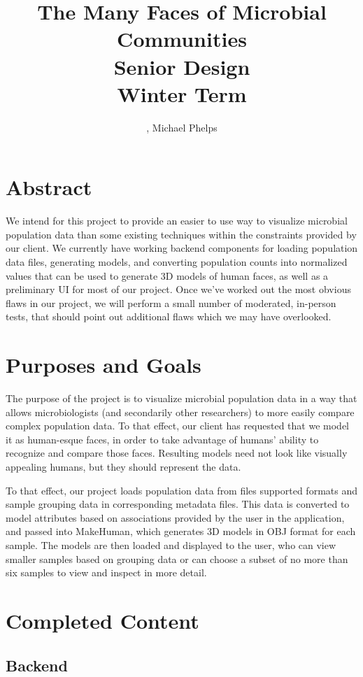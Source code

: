 \documentclass[letterpaper,10pt, onecolumn]{IEEEtran}
\title{The Many Faces of Microbial Communities \\\large Senior Design\\Winter Term\\}
\author{\name, Michael Phelps}
\begin{document}
\maketitle
\section*{Abstract}
We intend for this project to provide an easier to use way to visualize microbial population data than some existing techniques within the constraints provided by our client. We currently have working backend components for loading population data files, generating models, and converting population counts into normalized values that can be used to generate 3D models of human faces, as well as a preliminary UI for most of our project. Once we've worked out the most obvious flaws in our project, we will perform a small number of moderated, in-person tests, that should point out additional flaws which we may have overlooked. 

\clearpage
\section*{Purposes and Goals}

The purpose of the project is to visualize microbial population data in a way that allows microbiologists (and secondarily other researchers) to more easily compare complex population data. To that effect, our client has requested that we model it as human-esque faces, in order to take advantage of humans' ability to recognize and compare those faces. Resulting models need not look like visually appealing humans, but they should represent the data.

To that effect, our project loads population data from files supported formats and sample grouping data in corresponding metadata files. This data is converted to model attributes based on associations provided by the user in the application, and passed into MakeHuman, which generates 3D models in OBJ format for each sample. The models are then loaded and displayed to the user, who can view smaller samples based on grouping data or can choose a subset of no more than six samples to view and inspect in more detail.

\section*{Completed Content}

\subsection*{Backend}
\end{document}
